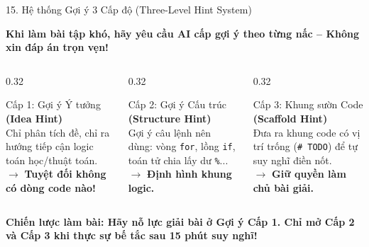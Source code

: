 \documentclass[aspectratio=169, 10pt]{beamer}
\begin{document}
\begin{frame}{15. Hệ thống Gợi ý 3 Cấp độ (Three-Level Hint System)}
  \begin{tcolorbox}[colback=primaryblue!8, colframe=primaryblue, arc=3pt, left=6pt, right=6pt, top=2pt, bottom=2pt]
    \centering\footnotesize\bfseries Khi làm bài tập khó, hãy yêu cầu AI cấp gợi ý theo từng nấc -- Không xin đáp án trọn vẹn!
  \end{tcolorbox}
  \vspace{0.08cm}
  \begin{columns}[T]
    \begin{column}{0.32\textwidth}
      \begin{cbox}[primaryblue]{Cấp 1: Gợi ý Ý tưởng}
        \scriptsize
        \textbf{(Idea Hint)}\\[2pt]
        Chỉ phân tích đề, chỉ ra hướng tiếp cận logic toán học/thuật toán.\\
        \vspace{2pt}
        $\rightarrow$ \textbf{Tuyệt đối không có dòng code nào!}
      \end{cbox}
    \end{column}
    \begin{column}{0.32\textwidth}
      \begin{cbox}[secondarygreen]{Cấp 2: Gợi ý Cấu trúc}
        \scriptsize
        \textbf{(Structure Hint)}\\[2pt]
        Gợi ý câu lệnh nên dùng: vòng \texttt{for}, lồng \texttt{if}, toán tử chia lấy dư \texttt{\%}...\\
        \vspace{2pt}
        $\rightarrow$ \textbf{Định hình khung logic.}
      \end{cbox}
    \end{column}
    \begin{column}{0.32\textwidth}
      \begin{cbox}[accentorange]{Cấp 3: Khung sườn Code}
        \scriptsize
        \textbf{(Scaffold Hint)}\\[2pt]
        Đưa ra khung code có vị trí trống (\texttt{\# TODO}) để tự suy nghĩ điền nốt.\\
        \vspace{2pt}
        $\rightarrow$ \textbf{Giữ quyền làm chủ bài giải.}
      \end{cbox}
    \end{column}
  \end{columns}
  \vspace{0.1cm}
  \begin{tcolorbox}[colback=accentorange!10, colframe=accentorange, arc=3pt, left=6pt, right=6pt, top=2pt, bottom=2pt]
    \centering\scriptsize\bfseries
    Chiến lược làm bài: Hãy nỗ lực giải bài ở Gợi ý Cấp 1. Chỉ mở Cấp 2 và Cấp 3 khi thực sự bế tắc sau 15 phút suy nghĩ!
  \end{tcolorbox}
\end{frame}
\end{document}
